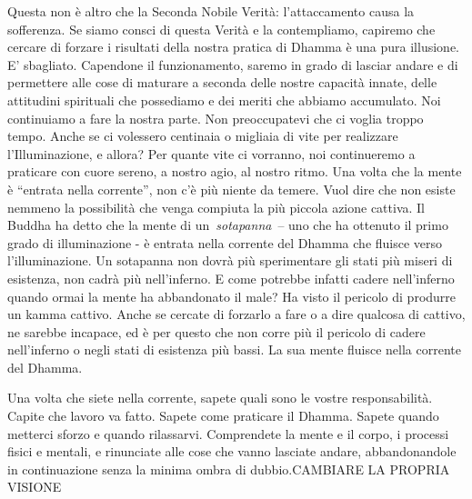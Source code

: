 Questa non è altro che la Seconda Nobile Verità: l'attaccamento causa la
sofferenza. Se siamo consci di questa Verità e la contempliamo, capiremo
che cercare di forzare i risultati della nostra pratica di Dhamma è una
pura illusione. E' sbagliato. Capendone il funzionamento, saremo in
grado di lasciar andare e di permettere alle cose di maturare a seconda
delle nostre capacità innate, delle attitudini spirituali che possediamo
e dei meriti che abbiamo accumulato. Noi continuiamo a fare la nostra
parte. Non preoccupatevi che ci voglia troppo tempo. Anche se ci
volessero centinaia o migliaia di vite per realizzare l'Illuminazione, e
allora? Per quante vite ci vorranno, noi continueremo a praticare con
cuore sereno, a nostro agio, al nostro ritmo. Una volta che la mente è
``entrata nella corrente'', non c'è più niente da temere. Vuol dire che
non esiste nemmeno la possibilità che venga compiuta la più piccola
azione cattiva. Il Buddha ha detto che la mente di
un~\emph{sotapanna}~-- uno che ha ottenuto il primo grado di
illuminazione - è entrata nella corrente del Dhamma che fluisce verso
l'illuminazione. Un sotapanna non dovrà più sperimentare gli stati più
miseri di esistenza, non cadrà più nell'inferno. E come potrebbe infatti
cadere nell'inferno quando ormai la mente ha abbandonato il male? Ha
visto il pericolo di produrre un kamma cattivo. Anche se cercate di
forzarlo a fare o a dire qualcosa di cattivo, ne sarebbe incapace, ed è
per questo che non corre più il pericolo di cadere nell'inferno o negli
stati di esistenza più bassi. La sua mente fluisce nella corrente del
Dhamma.

Una volta che siete nella corrente, sapete quali sono le vostre
responsabilità. Capite che lavoro va fatto. Sapete come praticare il
Dhamma. Sapete quando metterci sforzo e quando rilassarvi. Comprendete
la mente e il corpo, i processi fisici e mentali, e rinunciate alle cose
che vanno lasciate andare, abbandonandole in continuazione senza la
minima ombra di dubbio.CAMBIARE LA PROPRIA VISIONE

